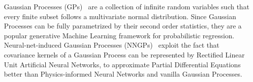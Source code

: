 %
Gaussian Processes (GPs)~\cite{mackay1998introduction} are a collection of infinite random variables such that every finite subset follows a multivariate normal distribution. Since Gaussian Processes can be fully parametrized by their second order statistics, they are a popular generative Machine Learning framework for probabilistic regression.
Neural-net-induced Gaussian Processes (NNGPs)~\cite{pang2019neural} exploit the fact that covariance kernels of a Gaussian Process can be represented by Rectified Linear Unit Artificial Neural Networks, to approximate Partial Differential Equations better than Physics-informed Neural Networks and vanilla Gaussian Processes.

